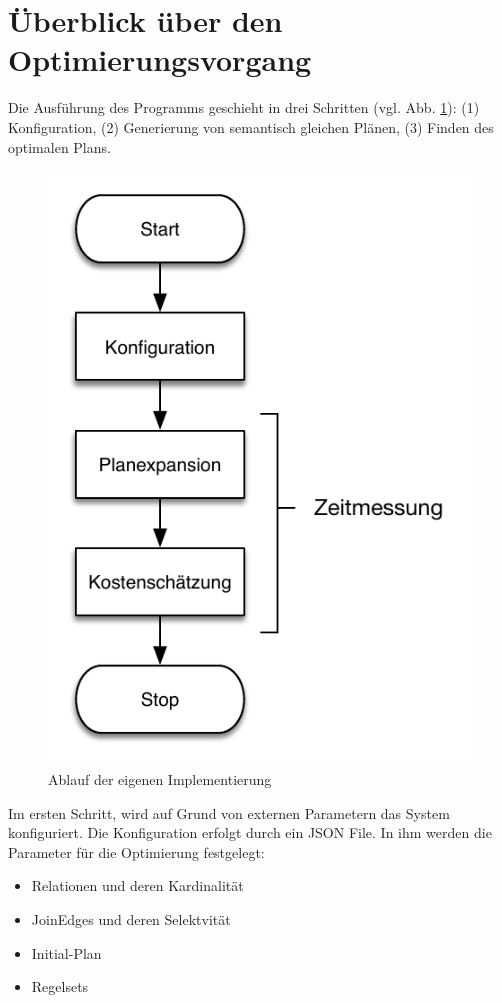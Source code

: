 \section{Überblick über den Optimierungsvorgang}
Die Ausführung des Programms geschieht in drei Schritten (vgl. Abb. \ref{Ablauf}): (1) Konfiguration, (2) Generierung von semantisch gleichen Plänen, (3) Finden des optimalen Plans.

\begin{figure}[h]
  \centering
  \includegraphics{04_Implementierung/Ablauf.pdf}
  \caption{Ablauf der eigenen Implementierung}
  \label{Ablauf}
\end{figure}


Im ersten Schritt, wird auf Grund von externen Parametern das System konfiguriert. Die Konfiguration erfolgt durch ein JSON File. In ihm werden die Parameter für die Optimierung festgelegt:

\begin{itemize}
\item Relationen und deren Kardinalität 
\item JoinEdges und deren Selektvität
\item Initial-Plan
\item Regelsets
\end{itemize}

